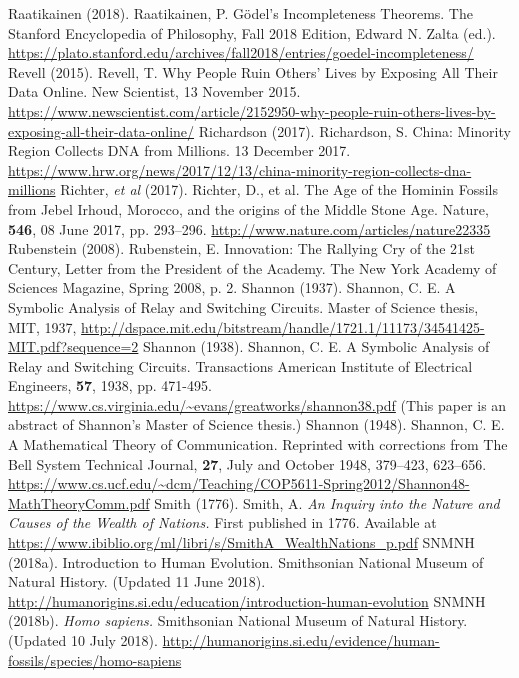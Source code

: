 \begin{multicols}{2}
\begin{thebibliography}{99}
 Raatikainen (2018). Raatikainen, P. Gödel’s Incompleteness Theorems. The Stanford Encyclopedia of Philosophy, Fall 2018 Edition, Edward N. Zalta (ed.). \url{https://plato.stanford.edu/archives/fall2018/entries/goedel-incompleteness/}
 Revell (2015). Revell, T. Why People Ruin Others’ Lives by Exposing All Their Data Online. New Scientist, 13 November 2015. \url{https://www.newscientist.com/article/2152950-why-people-ruin-others-lives-by-exposing-all-their-data-online/}
 Richardson (2017). Richardson, S. China: Minority Region Collects DNA from Millions. 13 December 2017. \url{https://www.hrw.org/news/2017/12/13/china-minority-region-collects-dna-millions}
 Richter, \textit{et al} (2017). Richter, D., et al. The Age of the Hominin Fossils from Jebel Irhoud, Morocco, and the origins of the Middle Stone Age. Nature, \textbf{546}, 08 June 2017, pp. 293–296. \url{http://www.nature.com/articles/nature22335}
 Rubenstein (2008). Rubenstein, E. Innovation: The Rallying Cry of the 21st Century, Letter from the President of the Academy. The New York Academy of Sciences Magazine, Spring 2008, p. 2.
 Shannon (1937). Shannon, C. E. A Symbolic Analysis of Relay and Switching Circuits. Master of Science thesis, MIT, 1937, \url{http://dspace.mit.edu/bitstream/handle/1721.1/11173/34541425-MIT.pdf?sequence=2}
 Shannon (1938). Shannon, C. E. A Symbolic Analysis of Relay and Switching Circuits. Transactions American Institute of Electrical Engineers, \textbf{57}, 1938, pp. 471-495. \url{https://www.cs.virginia.edu/~evans/greatworks/shannon38.pdf} (This paper is an abstract of Shannon’s Master of Science thesis.)
 Shannon (1948). Shannon, C. E. A Mathematical Theory of Communication. Reprinted with corrections from The Bell System Technical Journal, \textbf{27}, July and October 1948, 379–423, 623–656. \url{https://www.cs.ucf.edu/~dcm/Teaching/COP5611-Spring2012/Shannon48-MathTheoryComm.pdf}
 Smith (1776). Smith, A. \textit{An Inquiry into the Nature and Causes of the Wealth of Nations.} First published in 1776. Available at \url{https://www.ibiblio.org/ml/libri/s/SmithA_WealthNations_p.pdf}
 SNMNH (2018a). Introduction to Human Evolution. Smithsonian National Museum of Natural History. (Updated 11 June 2018). \url{http://humanorigins.si.edu/education/introduction-human-evolution}
 SNMNH (2018b). \textit{Homo sapiens.} Smithsonian National Museum of Natural History. (Updated 10 July 2018). \url{http://humanorigins.si.edu/evidence/human-fossils/species/homo-sapiens}

\end{thebibliography}
\end{multicols}
